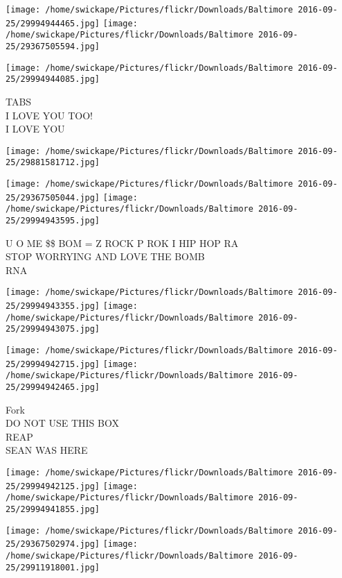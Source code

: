 \documentclass[10pt,letterpaper]{article}
\begin{document}
\texttt{[image: /home/swickape/Pictures/flickr/Downloads/Baltimore 2016-09-25/29994944465.jpg]}
\texttt{[image: /home/swickape/Pictures/flickr/Downloads/Baltimore 2016-09-25/29367505594.jpg]}

\vspace{0.25in}
\texttt{[image: /home/swickape/Pictures/flickr/Downloads/Baltimore 2016-09-25/29994944085.jpg]}

TABS\\
I LOVE YOU TOO!\\
I LOVE YOU
\pagebreak

\texttt{[image: /home/swickape/Pictures/flickr/Downloads/Baltimore 2016-09-25/29881581712.jpg]}

\vspace{0.25in}
\texttt{[image: /home/swickape/Pictures/flickr/Downloads/Baltimore 2016-09-25/29367505044.jpg]}
\texttt{[image: /home/swickape/Pictures/flickr/Downloads/Baltimore 2016-09-25/29994943595.jpg]}

U O ME \$\$ BOM = Z ROCK P ROK I HIP HOP RA\\
STOP WORRYING AND LOVE THE BOMB\\
RNA
\pagebreak

\texttt{[image: /home/swickape/Pictures/flickr/Downloads/Baltimore 2016-09-25/29994943355.jpg]}
\texttt{[image: /home/swickape/Pictures/flickr/Downloads/Baltimore 2016-09-25/29994943075.jpg]}

\texttt{[image: /home/swickape/Pictures/flickr/Downloads/Baltimore 2016-09-25/29994942715.jpg]}
\texttt{[image: /home/swickape/Pictures/flickr/Downloads/Baltimore 2016-09-25/29994942465.jpg]}

Fork\\
DO NOT USE THIS BOX\\
REAP\\
SEAN WAS HERE
\pagebreak

\texttt{[image: /home/swickape/Pictures/flickr/Downloads/Baltimore 2016-09-25/29994942125.jpg]}
\texttt{[image: /home/swickape/Pictures/flickr/Downloads/Baltimore 2016-09-25/29994941855.jpg]}

\texttt{[image: /home/swickape/Pictures/flickr/Downloads/Baltimore 2016-09-25/29367502974.jpg]}
\texttt{[image: /home/swickape/Pictures/flickr/Downloads/Baltimore 2016-09-25/29911918001.jpg]}
\end{document}
